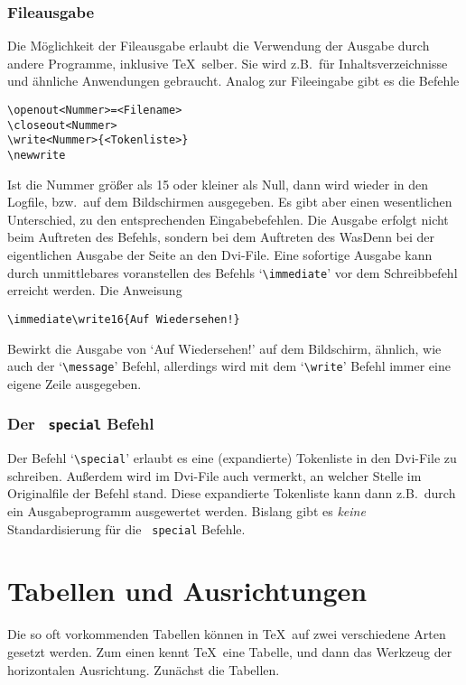 \subsection{Fileausgabe}
Die M\"oglichkeit der Fileausgabe erlaubt die Verwendung der Ausgabe
durch andere Programme, inklusive \TeX\ selber. Sie wird z.B.\ f\"ur
Inhaltsverzeichnisse und \"ahnliche Anwendungen gebraucht. Analog zur
Fileeingabe gibt es die Befehle
\begin{verbatim}
\openout<Nummer>=<Filename>
\closeout<Nummer>
\write<Nummer>{<Tokenliste>}
\newwrite
\end{verbatim}
Ist die Nummer gr\"o\ss{}er als 15 oder kleiner als Null, dann wird wieder
in den Logfile, bzw.\ auf dem 
Bildschirmen ausgegeben. Es gibt aber
einen wesentlichen Unterschied, zu den entsprechenden Eingabebefehlen.
Die Ausgabe erfolgt nicht beim Auftreten des Befehls, sondern bei dem
Auftreten des WasDenn bei der eigentlichen Ausgabe der
Seite an den
Dvi-File. Eine sofortige Ausgabe kann durch unmittlebares voranstellen
des Befehls 
`\verb|\immediate|' vor dem Schreibbefehl erreicht werden.
Die Anweisung
\begin{verbatim}
\immediate\write16{Auf Wiedersehen!}
\end{verbatim}
Bewirkt die Ausgabe von `Auf Wiedersehen!' auf dem 
Bildschirm,
\"ahnlich, wie auch der 
`\verb|\message|' Befehl, allerdings wird mit
dem `\verb|\write|' Befehl immer eine eigene Zeile ausgegeben.
\subsection{Der {\tt{} special} Befehl}
Der Befehl 
`\verb|\special|' erlaubt es eine (expandierte) Tokenliste
in den Dvi-File zu schreiben. Au\ss{}erdem wird im Dvi-File auch vermerkt,
an welcher Stelle im Originalfile der Befehl stand. Diese expandierte
Tokenliste kann dann z.B.\ durch ein Ausgabeprogramm ausgewertet
werden. Bislang gibt es {\em keine} Standardisierung f\"ur die
{\tt{} special} Befehle.
\chapter{Tabellen und Ausrichtungen}
Die so oft vorkommenden Tabellen k\"onnen in \TeX\ auf zwei verschiedene
Arten gesetzt werden. Zum einen kennt \TeX\ eine Tabelle, und dann das
Werkzeug der 
horizontalen Ausrichtung. Zun\"achst die Tabellen.
